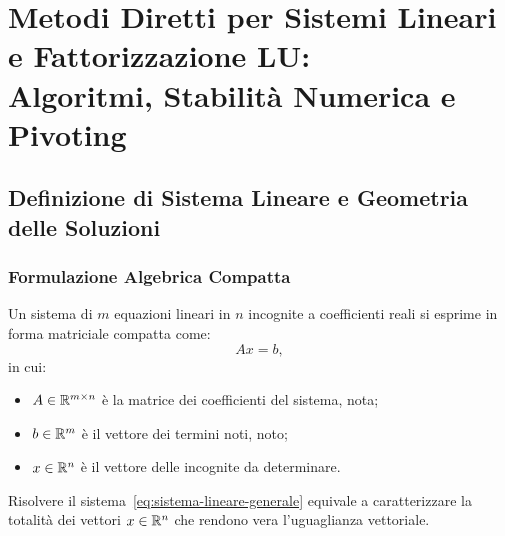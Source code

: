 \chapter[Metodi Diretti per Sistemi Lineari e Fattorizzazione LU]{Metodi Diretti per Sistemi Lineari e Fattorizzazione LU:\\Algoritmi, Stabilit\`a Numerica e Pivoting}
\label{chap:metodi-diretti-fattorizzazione-lu}

\FloatBarrier
\section{Definizione di Sistema Lineare e Geometria delle Soluzioni}
\label{sec:def-sistema-lineare-geometria}

\subsection{Formulazione Algebrica Compatta}
Un sistema di $m$ equazioni lineari in $n$ incognite a coefficienti reali si esprime in forma matriciale compatta come:
\begin{equation}
    Ax = b,
    \label{eq:sistema-lineare-generale}
\end{equation}
in cui:
\begin{itemize}
    \item $A \in \mathbb{R}^{m \times n}$ \`e la matrice dei coefficienti del sistema, nota;
    \item $b \in \mathbb{R}^m$ \`e il vettore dei termini noti, noto;
    \item $x \in \mathbb{R}^n$ \`e il vettore delle incognite da determinare.
\end{itemize}

Risolvere il sistema~\eqref{eq:sistema-lineare-generale} equivale a caratterizzare la totalit\`a dei vettori $x \in \mathbb{R}^n$ che rendono vera l'uguaglianza vettoriale.

